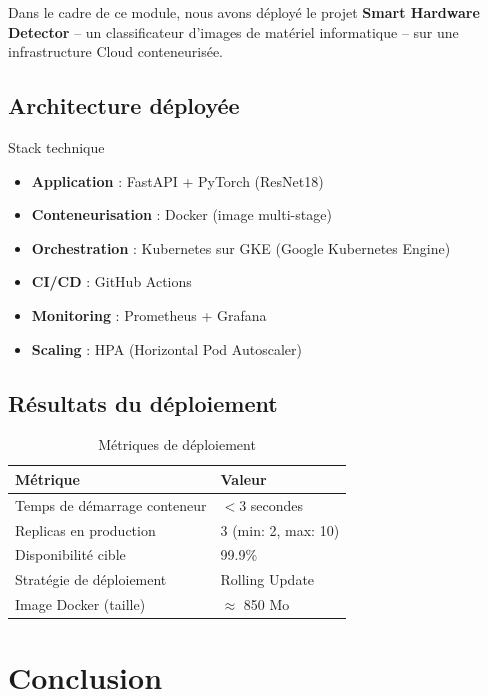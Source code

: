 \documentclass[12pt,a4paper]{article}
\begin{document}
Dans le cadre de ce module, nous avons déployé le projet \textbf{Smart Hardware Detector} -- un classificateur d'images de matériel informatique -- sur une infrastructure Cloud conteneurisée.

\subsection{Architecture déployée}

\begin{keybox}{Stack technique}
\begin{itemize}[noitemsep]
    \item \textbf{Application} : FastAPI + PyTorch (ResNet18)
    \item \textbf{Conteneurisation} : Docker (image multi-stage)
    \item \textbf{Orchestration} : Kubernetes sur GKE (Google Kubernetes Engine)
    \item \textbf{CI/CD} : GitHub Actions
    \item \textbf{Monitoring} : Prometheus + Grafana
    \item \textbf{Scaling} : HPA (Horizontal Pod Autoscaler)
\end{itemize}
\end{keybox}

\subsection{Résultats du déploiement}

\begin{table}[H]
\centering
\begin{tabular}{@{}ll@{}}
\toprule
\textbf{Métrique} & \textbf{Valeur} \\
\midrule
Temps de démarrage conteneur & $< 3$ secondes \\
Replicas en production & 3 (min: 2, max: 10) \\
Disponibilité cible & 99.9\% \\
Stratégie de déploiement & Rolling Update \\
Image Docker (taille) & $\approx$ 850 Mo \\
\bottomrule
\end{tabular}
\caption{Métriques de déploiement}
\end{table}

\section{Conclusion}
\end{document}
